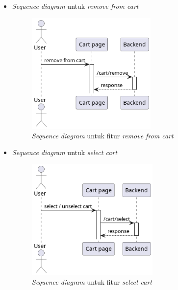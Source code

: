 \documentclass[a4paper]{article}
\begin{document}
\begin{enumerate}
\begin{enumerate}
\begin{itemize}
            \newpage
            \item \textit{Sequence diagram} untuk \textit{remove from cart}
            \begin{figure}[h]
                \centering
                \includegraphics*[height=6cm]{diagram/sequence diagram/FE/13. cart/remove from cart/template.png}
                \caption{\textit{Sequence diagram} untuk fitur \textit{remove from cart}}
            \end{figure}

            \item \textit{Sequence diagram} untuk \textit{select cart}
            \begin{figure}[h]
                \centering
                \includegraphics*[height=6cm]{diagram/sequence diagram/FE/13. cart/select cart/template.png}
                \caption{\textit{Sequence diagram} untuk fitur \textit{select cart}}
            \end{figure}


\end{itemize}
\end{enumerate}
\end{enumerate}
\end{document}
